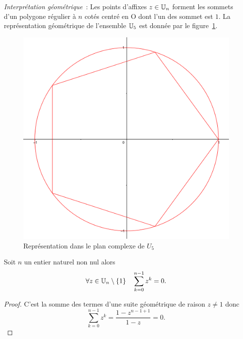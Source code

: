 \emph{Interprétation géométrique}~: Les points d'affixes $z \in \mathbb{U}_n$ forment les sommets d'un polygone régulier à $n$ cotés centré en O dont l'un des sommet est $1$. La représentation géométrique de l'ensemble $\mathbb{U}_5$ est donnée par le figure~\ref{fig:racinesnieme}.
\begin{figure}
  \centering
  \includegraphics[scale=2.5]{racines-nieme.png}
  \caption{Représentation dans le plan complexe de $U_5$}
  \label{fig:racinesnieme}
\end{figure}

\begin{theo}
  Soit $n$ un entier naturel non nul alors
  \begin{equation}
    \forall z \in \mathbb{U}_n \setminus \{1\} \quad \sum_{k=0}^{n-1} z^k = 0.
  \end{equation}
\end{theo}
\begin{proof}
  C'est la somme des termes d'une suite géométrique de raison $z \neq 1$ donc
  \begin{equation}
    \sum_{k=0}^{n-1} z^k = \frac{1-z^{n-1+1}}{1-z} = 0.
  \end{equation}
\end{proof}


